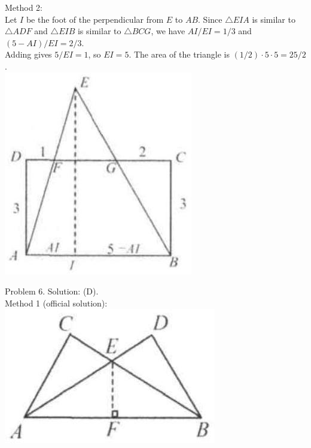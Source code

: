 \documentclass[10pt]{article}
\begin{document}
Method 2:\\
Let \(I\) be the foot of the perpendicular from \(E\) to \(A B\). Since \(\triangle E I A\) is similar to \(\triangle A D F\) and \(\triangle E I B\) is similar to \(\triangle B C G\), we have \(A I / E I=1 / 3\) and \((5-A I) / E I=2 / 3\).\\
Adding gives \(5 / E I=1\), so \(E I=5\). The area of the triangle is \((1 / 2) \cdot 5 \cdot 5=25 / 2\).\\
\includegraphics[max width=\textwidth, center]{2025_04_17_97bc1f7e44d93c271a88g-093(1)}

Problem 6. Solution: (D).\\
Method 1 (official solution):\\
\includegraphics[max width=\textwidth, center]{2025_04_17_97bc1f7e44d93c271a88g-093(2)}
\end{document}
